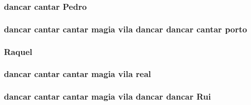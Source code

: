 \subsubsection[{\texorpdfstring{Pedro}{Pedro}}]{ {\bf dancar} {\bf cantar} Pedro}\hypertarget{jurados_8txt_af78ef3d9a9c21ea40fb35f0daf236401}{}\label{jurados_8txt_af78ef3d9a9c21ea40fb35f0daf236401}
\subsubsection[{\texorpdfstring{porto}{porto}}]{ {\bf dancar} {\bf cantar} {\bf cantar} {\bf magia} vila {\bf dancar} {\bf dancar} {\bf cantar} porto}\hypertarget{jurados_8txt_a50f37943ca5db274938bcee517a283cc}{}\label{jurados_8txt_a50f37943ca5db274938bcee517a283cc}
\subsubsection[{\texorpdfstring{Raquel}{Raquel}}]{ Raquel}\hypertarget{jurados_8txt_a3df76ea828422a61d89bb908cc76c7e0}{}\label{jurados_8txt_a3df76ea828422a61d89bb908cc76c7e0}
\subsubsection[{\texorpdfstring{real}{real}}]{ {\bf dancar} {\bf cantar} {\bf cantar} {\bf magia} vila real}\hypertarget{jurados_8txt_a793d0656b1424f0c6a8d185ee27b769e}{}\label{jurados_8txt_a793d0656b1424f0c6a8d185ee27b769e}
\subsubsection[{\texorpdfstring{Rui}{Rui}}]{ {\bf dancar} {\bf cantar} {\bf cantar} {\bf magia} vila {\bf dancar} {\bf dancar} Rui}\hypertarget{jurados_8txt_afae26757e6180cef120017b01ac06140}{}\label{jurados_8txt_afae26757e6180cef120017b01ac06140}
